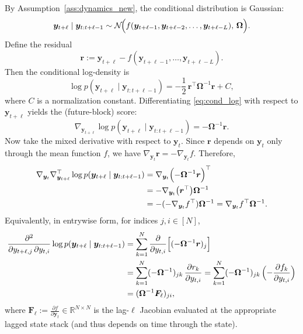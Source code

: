 \documentclass{article}
\theoremstyle{plain}
\theoremstyle{definition}
\theoremstyle{remark}
\newcommand{\R}{\mathbb{R}}
\newcommand{\1}{\mathbf{1}}
\newcommand{\y}{\bm{y}}
\begin{document}
By Assumption~\ref{ass:dynamics_new}, the conditional distribution is Gaussian:
$$
\y_{t+\ell} \mid \y_{t:t+\ell-1}
\sim
\mathcal{N}\!\Bigl(f(\y_{t+\ell-1},\y_{t+\ell-2},\ldots,\y_{t+\ell-L}),\,\bm{\Omega}\Bigr).
$$
Define the residual
$$
\bm{r}
:=
\y_{t+\ell} - f(\y_{t+\ell-1},\ldots,\y_{t+\ell-L}).
$$
Then the conditional log-density is
\begin{equation}
\log p(\y_{t+\ell}\mid \y_{t:t+\ell-1})
=
-\frac{1}{2}\,\bm{r}^{\top}\bm{\Omega}^{-1}\bm{r} + C,
\label{eq:cond_log}
\end{equation}
where $C$ is a normalization constant. Differentiating \eqref{eq:cond_log} with respect to $\y_{t+\ell}$ yields the (future-block) score:
\begin{equation}
\nabla_{\y_{t+\ell}} \log p(\y_{t+\ell}\mid \y_{t:t+\ell-1})
=
-\bm{\Omega}^{-1}\bm{r}.
\label{eq:future_score}
\end{equation}
Now take the mixed derivative with respect to $\y_t$. Since $\bm{r}$ depends on $\y_t$ only through the mean function $f$, we have $\nabla_{\y_t}\bm{r} = -\nabla_{\y_t} f$. Therefore,
\begin{align}
\nabla_{\y_t}\nabla_{\y_{t+\ell}}^{\top}\log p(\y_{t+\ell}\mid \y_{t:t+\ell-1})
&=
\nabla_{\y_t}\Bigl(-\bm{\Omega}^{-1}\bm{r}\Bigr)^{\top}
\nonumber\\
&=
-\nabla_{\y_t}\bigl(\bm{r}^{\top}\bigr)\bm{\Omega}^{-1}
\nonumber\\
&=
-( -\nabla_{\y_t} f^{\top})\bm{\Omega}^{-1}
=
\nabla_{\y_t} f^{\top}\bm{\Omega}^{-1}.
\label{eq:mixed_hess_intermediate}
\end{align}
Equivalently, in entrywise form, for indices $j,i \in [N]$,
\begin{align}
\frac{\partial^2}{\partial y_{t+\ell,j}\,\partial y_{t,i}}
\log p(\y_{t+\ell}\mid \y_{t:t+\ell-1})
&=
\sum_{k=1}^{N}
\frac{\partial}{\partial y_{t,i}}
\Bigl[(-\bm{\Omega}^{-1}\bm{r})_j\Bigr]
\nonumber\\
&=
\sum_{k=1}^{N}
(-\bm{\Omega}^{-1})_{jk}\,\frac{\partial r_k}{\partial y_{t,i}}
=
\sum_{k=1}^{N}
(-\bm{\Omega}^{-1})_{jk}\,\Bigl(-\frac{\partial f_k}{\partial y_{t,i}}\Bigr)
\nonumber\\
&=
(\bm{\Omega}^{-1}\bm{F}_\ell)_{j i},
\label{eq:mixed_hess_entry}
\end{align}
where $\bm{F}_\ell := \frac{\partial f}{\partial \y_t}\in \R^{N\times N}$ is the lag-$\ell$ Jacobian evaluated at the appropriate lagged state stack (and thus depends on time through the state).
\end{document}
